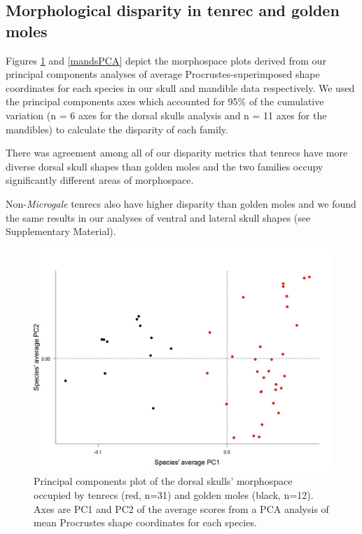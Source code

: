 \documentclass[12pt,a4paper]{article}
\begin{document}
\subsection{Morphological disparity in tenrec and golden moles} 

Figures  \ref{skdorsPCA} and \ref{mandsPCA} depict the morphospace plots derived from our principal components analyses of average Procrustes-superimposed shape coordinates for each species in our skull and mandible data respectively. We used the principal components axes which accounted for 95\% of the cumulative variation (n = 6 axes for the dorsal skulls analysis and n = 11 axes for the mandibles) to calculate the disparity of each family. 

There was agreement among all of our disparity metrics that tenrecs have more diverse dorsal skull shapes than golden moles
and the two families occupy significantly different areas of morphospace.

Non-\textit{Microgale} tenrecs also have higher disparity than golden moles and we found the same results in our analyses of ventral and lateral skull shapes (see Supplementary Material).




	
\begin{figure}[H]
\centering
\includegraphics[width=1\linewidth]{SkDors_Tenrecs+Gmoles_PC1PC2_01_05.jpg}
\caption{Principal components plot of the dorsal skulls' morphospace occupied by tenrecs (red, n=31) and golden moles (black, n=12). Axes are PC1 and PC2 of the average scores from a PCA analysis of mean Procrustes shape coordinates for each species. }
\label{skdorsPCA}
\end{figure}
\end{document}
